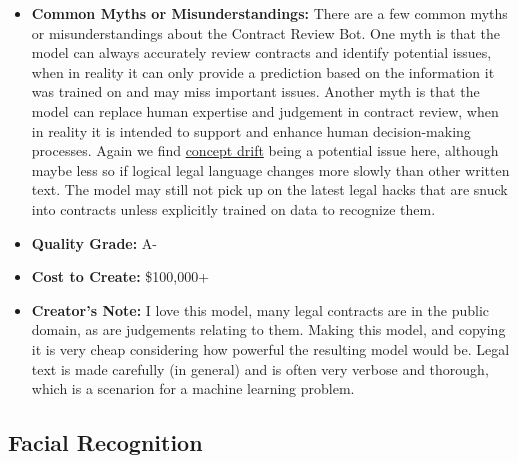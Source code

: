 \begin{itemize}
    \item \textbf{Common Myths or Misunderstandings:} There are a few common myths or misunderstandings about the Contract Review Bot. One myth is that the model can always accurately review contracts and identify potential issues, when in reality it can only provide a prediction based on the information it was trained on and may miss important issues. Another myth is that the model can replace human expertise and judgement in contract review, when in reality it is intended to support and enhance human decision-making processes. Again we find \hyperref[sec:drift]{concept drift} being a potential issue here, although maybe less so if logical legal language changes more slowly than other written text. The model may still not pick up on the latest legal hacks that are snuck into contracts unless explicitly trained on data to recognize them.  
    \item \textbf{Quality Grade:} A-
    \item \textbf{Cost to Create:} \$100,000+
    \item \textbf{Creator's Note:} I love this model, many legal contracts are in the public domain, as are judgements relating to them. Making this model, and copying it is very cheap considering how powerful the resulting model would be. Legal text is made carefully (in general) and is often very verbose and thorough, which is a scenarion for a machine learning problem.  
\end{itemize}

\subsection{Facial Recognition}

